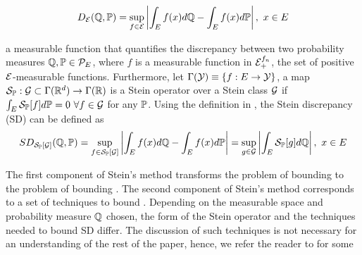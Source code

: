 \begin{equation}\label{IPM}
D_{\mathcal{E}}(\mathbb{Q}, \mathbb{P}) = \sup_{f \in \mathcal{E}}\left|\int_E f(x)d\mathbb{Q} - \int_E f(x)d\mathbb{P}\right|, \ x \in E
\end{equation}

a measurable function that quantifies the discrepancy between two probability measures $\mathbb{Q},\mathbb{P} \in \mathcal{P}_{E}$, where $f$ is a measurable function in $\mathcal{E}_+^{f_n}$, the set of positive $\mathcal{E}$-measurable functions. Furthermore, let $\Gamma(\mathcal{Y}) \equiv \{f: E \rightarrow \mathcal{Y} \}$, a map $\mathcal{S}_{\mathbb{P}}: \mathcal{G} \subset \Gamma(\mathbb{R}^d) \rightarrow \Gamma(\mathbb{R})$ is a Stein operator over a Stein class $\mathcal{G}$ if $\int_E \mathcal{S}_{\mathbb{P}}[f]d\mathbb{P} = 0 \ \forall f \in \mathcal{G}$ for any $\mathbb{P}$. Using the definition in , the Stein discrepancy (SD) can be defined as 
\begin{equation}\label{stein_discrepancy}
SD_{\mathcal{S}_{\mathbb{P}}[\mathcal{G}]}(\mathbb{Q},\mathbb{P}) = \sup_{f \in \mathcal{S}_{\mathbb{P}}[\mathcal{G}]} \left|\int_E f(x)d\mathbb{Q} - \int_E f(x)d\mathbb{P} \right| = \sup_{g \in \mathcal{G}}\left|\int_E \mathcal{S}_{\mathbb{P}}[g]d\mathbb{Q} \right|, \ x \in E
\end{equation}

The first component of Stein's method transforms the problem of bounding  to the problem of bounding . The second component of Stein's method corresponds to a set of techniques to bound . Depending on the measurable space and probability measure $\mathbb{Q}$ chosen, the form of the Stein operator and the techniques needed to bound SD differ. The discussion of such techniques is not necessary for an understanding of the rest of the paper, hence, we refer the reader to \cite{ross2011fundamentals} for some 





